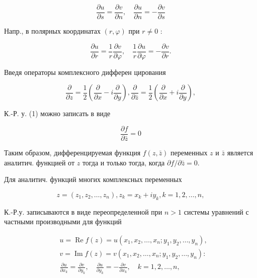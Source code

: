 \documentclass[10pt]{article}
\begin{document}
\[

\frac{\partial u}{\partial s}=\frac{\partial v}{\partial n}, \quad \frac{\partial u}{\partial n}=-\frac{\partial v}{\partial s}

\]



Напр., в полярных координатах $(r, \varphi)$ при $r \neq 0$ :



\[

\frac{\partial u}{\partial r}=\frac{1}{r} \frac{\partial v}{\partial \varphi}, \quad \frac{1}{r} \frac{\partial u}{\partial \varphi}=-\frac{\partial v}{\partial r} .

\]



Введя операторы комплексного дифферен цирования



\[

\frac{\partial}{\partial z}=\frac{1}{2}\left(\frac{\partial}{\partial x}-i \frac{\partial}{\partial y}\right), \frac{\partial}{\partial \bar{z}}=\frac{1}{2}\left(\frac{\partial}{\partial x}+i \frac{\partial}{\partial y}\right),

\]



К.-Р. у. (1) можно записать в виде



\[

\frac{\partial f}{\partial \bar{z}}=0

\]



Таким образом, дифференцируемая функция $f(z, \bar{z})$ переменных $z$ и $\bar{z}$ является аналитич. функцией от $z$ тогда и только тогда, когда $\partial f / \partial \bar{z}=0$.



Для аналитич. функций многих комплексных переменных



\[

z=\left(z_{1}, z_{2}, \ldots, z_{n}\right), z_{k}=x_{k}+i y_{k}, k=1,2, \ldots, n,

\]



К.-Р.у. записываются в виде переопределенной при $n>1$ системы уравнений с частными производными для функций



\[

\begin{aligned}

& u=\operatorname{Re} f(z)=u\left(x_{1}, x_{2}, \ldots, x_{n} ; y_{1}, y_{2}, \ldots, y_{n}\right), \\

& v=\operatorname{Im} f(z)=v\left(x_{1}, x_{2}, \ldots, x_{n} ; y_{1}, y_{2}, \ldots, y_{n}\right): \\

& \frac{\partial u}{\partial x_{k}}=\frac{\partial v}{\partial y_{k}}, \quad \frac{\partial u}{\partial y_{k}}=-\frac{\partial v}{\partial x_{k}}, \quad k=1,2, \ldots, n,

\end{aligned}

\]
\end{document}
